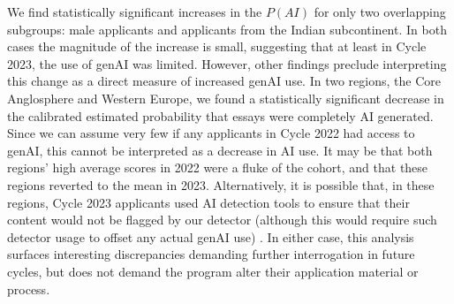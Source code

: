 We find statistically significant increases in the $P(AI)$ for only two overlapping subgroups: male applicants and applicants from the Indian subcontinent. In both cases the magnitude of the increase is small, suggesting that at least in Cycle 2023, the use of genAI was limited. However, other findings preclude interpreting this change as a direct measure of increased genAI use. In two regions, the Core Anglosphere and Western Europe, we found a statistically significant decrease in the calibrated estimated probability that essays were completely AI generated. Since we can assume very few if any applicants in Cycle 2022 had access to genAI, this cannot be interpreted as a decrease in AI use. It may be that both regions' high average scores in 2022 were a fluke of the cohort, and that these regions reverted to the mean in 2023. Alternatively, it is possible that, in these regions, Cycle 2023 applicants used AI detection tools to ensure that their content would not be flagged by our detector (although this would require such detector usage to offset any actual genAI use) \cite{gptzero_gptzero_2023}. In either case, this analysis surfaces interesting discrepancies demanding further interrogation in future cycles, but does not demand the program alter their application material or process.

